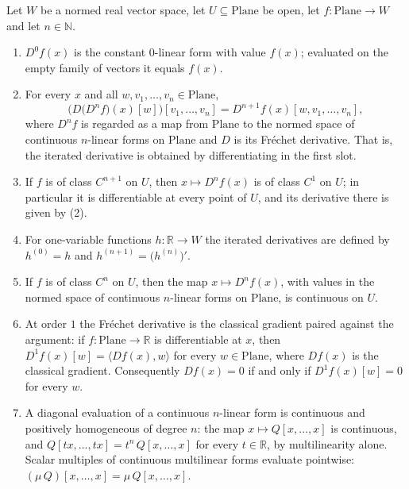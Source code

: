 \begin{proposition}
Let $W$ be a normed real vector space, let $U\subseteq\mathrm{Plane}$ be open, let
$f\colon\mathrm{Plane}\to W$ and let $n\in\mathbb{N}$.
\begin{enumerate}
\item $D^{0}f(x)$ is the constant $0$-linear form with value $f(x)$; evaluated on the empty
family of vectors it equals $f(x)$.
\item For every $x$ and all $w,v_1,\ldots,v_n\in\mathrm{Plane}$,
\[
  \bigl(D\bigl(D^{n}f\bigr)(x)[w]\bigr)[v_1,\ldots,v_n]=D^{n+1}f(x)[w,v_1,\ldots,v_n],
\]
where $D^{n}f$ is regarded as a map from $\mathrm{Plane}$ to the normed space of continuous
$n$-linear forms on $\mathrm{Plane}$ and $D$ is its Fr\'echet derivative.  That is, the
iterated derivative is obtained by differentiating in the first slot.
\item If $f$ is of class $C^{n+1}$ on $U$, then $x\mapsto D^{n}f(x)$ is of class $C^{1}$ on
$U$; in particular it is differentiable at every point of $U$, and its derivative there is
given by (2).
\item For one-variable functions $h\colon\mathbb{R}\to W$ the iterated derivatives are defined
by $h^{(0)}=h$ and $h^{(n+1)}=\bigl(h^{(n)}\bigr)'$.
\item If $f$ is of class $C^{n}$ on $U$, then the map $x\mapsto D^{n}f(x)$, with values in the
normed space of continuous $n$-linear forms on $\mathrm{Plane}$, is continuous on $U$.
\item At order $1$ the Fr\'echet derivative is the classical gradient paired against the
argument: if $f\colon\mathrm{Plane}\to\mathbb{R}$ is differentiable at $x$, then
$D^{1}f(x)[w]=\langle Df(x),w\rangle$ for every $w\in\mathrm{Plane}$, where $Df(x)$ is the
classical gradient.  Consequently $Df(x)=0$ if and only if $D^{1}f(x)[w]=0$ for every $w$.
\item A diagonal evaluation of a continuous $n$-linear form is continuous and positively
homogeneous of degree $n$: the map $x\mapsto Q[x,\ldots,x]$ is continuous, and
$Q[tx,\ldots,tx]=t^{n}\,Q[x,\ldots,x]$ for every $t\in\mathbb{R}$, by multilinearity alone.
Scalar multiples of continuous multilinear forms evaluate pointwise:
$(\mu\,Q)[x,\ldots,x]=\mu\,Q[x,\ldots,x]$.
\end{enumerate}
\end{proposition}

